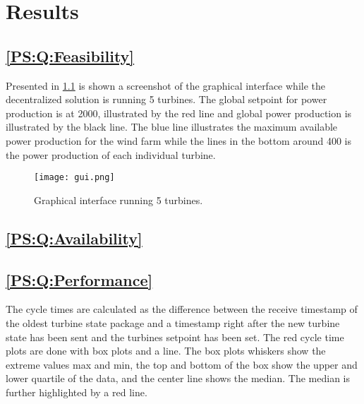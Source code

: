 
\newcommand{\resultsFigureWidthScale}{0.8}

\chapter{Results}
\label{chap:results}

\section{\ref{PS:Q:Feasibility}}
Presented in \cref{fig:graphicalInterface} is shown a screenshot of the graphical interface while the decentralized solution is running 5 turbines.
The global setpoint for power production is at 2000, illustrated by the red line and global power production is illustrated by the black line.
The blue line illustrates the maximum available power production for the wind farm while the lines in the bottom around 400 is the power production of each individual turbine.

\begin{figure} [!h]
	\centering
	\texttt{[image: gui.png]} 
	\caption[Graphical interface running 5 turbines]{
		\label{fig:graphicalInterface} 
		\footnotesize{%
			Graphical interface running 5 turbines.
		}
	}
\end{figure}


\section{\ref{PS:Q:Availability}}

\section{\ref{PS:Q:Performance}}
\label{sec:exp:performance}
The cycle times are calculated as the difference between the receive timestamp of the oldest turbine state package and a timestamp right after the new turbine state has been sent and the turbines setpoint has been set.
The red cycle time plots are done with box plots and a line. The box plots whiskers show the extreme values max and min, the top and bottom of the box show the upper and lower quartile of the data, and the center line shows the median. The median is further highlighted by a red line.

